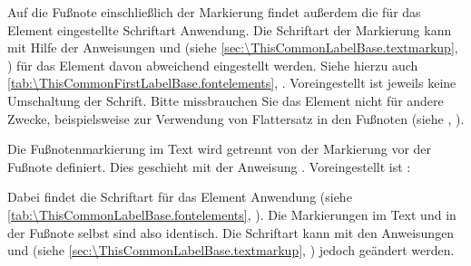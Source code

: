 \BeginIndexGroup
{}%
%
Auf%
 die Fußnote einschließlich der Markierung findet außerdem die für das
Element  eingestellte
Schriftart Anwendung. Die %
Schriftart der Markierung kann %
%
mit Hilfe der Anweisungen  und
 (siehe
\autoref{sec:\ThisCommonLabelBase.textmarkup},
) für das Element
 davon
abweichend eingestellt werden. Siehe hierzu auch
\autoref{tab:\ThisCommonFirstLabelBase.fontelements},
.  Voreingestellt ist
jeweils keine Umschaltung der Schrift.%
 Bitte missbrauchen Sie das Element nicht für andere
Zwecke, beispielsweise zur Verwendung von Flattersatz in den Fußnoten (siehe
,
).

%
%
Die Fußnotenmarkierung im Text wird getrennt von der Markierung vor der
Fußnote definiert. Dies geschieht mit der Anweisung
. Voreingestellt ist
:
\begin{lstcode}
\end{lstcode}
Dabei findet%
 die Schriftart für das Element
%
 Anwendung (siehe %
\autoref{tab:\ThisCommonLabelBase.fontelements},
). Die Markierungen im Text
und in der Fußnote selbst sind also identisch. Die Schriftart kann mit den
Anweisungen  und
 (siehe
\autoref{sec:\ThisCommonLabelBase.textmarkup},
) jedoch geändert
werden.

